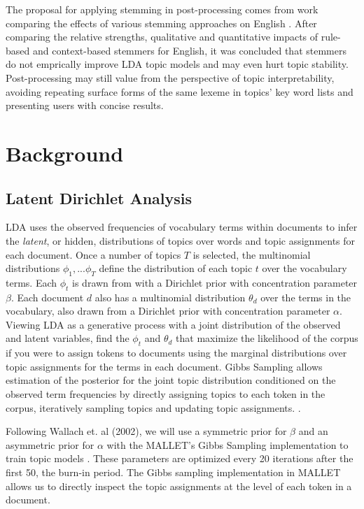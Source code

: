 \documentclass[11pt,a4paper]{article}
\begin{document}
The proposal for applying stemming in post-processing comes from work comparing the effects of various stemming approaches on English \cite{schofield-mimno-2016-comparing}. After comparing the relative strengths, qualitative and quantitative impacts of rule-based and context-based stemmers for English, it was concluded that stemmers do not emprically improve LDA topic models and may even hurt topic stability. Post-processing may still value from the perspective of topic interpretability, avoiding repeating surface forms of the same lexeme in topics' key word lists and presenting users with concise results.


\section{Background}

\subsection{Latent Dirichlet Analysis}
LDA uses the observed frequencies of vocabulary terms within documents to infer the \textit{latent}, or hidden, distributions of topics over words and topic assignments for each document. Once a number of topics $T$ is selected, the multinomial distributions $\phi_1,...\phi_T$ define the distribution of each topic $t$ over the vocabulary terms. Each $\phi_t$ is drawn from with a Dirichlet prior with concentration parameter $\beta$. Each document $d$ also has a multinomial distribution $\theta_d$ over the terms in the vocabulary, also drawn from a Dirichlet prior with concentration parameter $\alpha$. Viewing LDA as a generative process with a joint distribution of the observed and latent variables, find the $\phi_t$ and $\theta_d$ that maximize the likelihood of the corpus if you were to assign tokens to documents using the marginal distributions over topic assignments for the terms in each document. Gibbs Sampling allows estimation of the posterior for the joint topic distribution conditioned on the observed term frequencies by directly assigning topics to each token in the corpus, iteratively sampling topics and updating topic assignments.
 \cite{steyvers2007probabilistic, blei2003,schofield-mimno-2016-comparing}.

Following Wallach et. al (2002), we will use a symmetric prior for $\beta$ and an asymmetric prior for $\alpha$ with the MALLET's Gibbs Sampling implementation to train topic models \cite{wallach2009rethinking,McCallumMALLET}. These parameters are optimized every 20 iterations after the first 50, the burn-in period. The Gibbs sampling implementation in MALLET allows us to directly inspect the topic assignments at the level of each token in a document.
\end{document}
